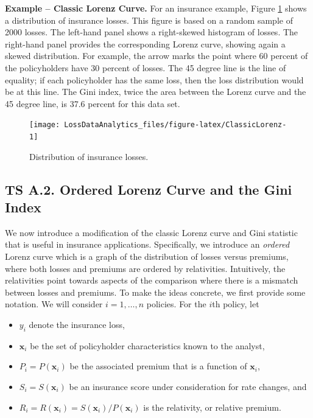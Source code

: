 \documentclass[]{book}
\providecommand{\tightlist}{%
  \setlength{\itemsep}{0pt}\setlength{\parskip}{0pt}}
\theoremstyle{definition}
\theoremstyle{definition}
\theoremstyle{definition}
\theoremstyle{remark}
\begin{document}
\textbf{Example -- Classic Lorenz Curve.} For an insurance example,
Figure \ref{fig:ClassicLorenz} shows a distribution of insurance losses.
This figure is based on a random sample of 2000 losses. The left-hand
panel shows a right-skewed histogram of losses. The right-hand panel
provides the corresponding Lorenz curve, showing again a skewed
distribution. For example, the arrow marks the point where 60 percent of
the policyholders have 30 percent of losses. The 45 degree line is the
line of equality; if each policyholder has the same loss, then the loss
distribution would be at this line. The Gini index, twice the area
between the Lorenz curve and the 45 degree line, is 37.6 percent for
this data set.

\begin{figure}

{\centering \texttt{[image: LossDataAnalytics\_files/figure-latex/ClassicLorenz-1]} 

}

\caption{Distribution of insurance losses.}\label{fig:ClassicLorenz}
\end{figure}

\subsection*{TS A.2. Ordered Lorenz Curve and the Gini
Index}\label{ts-a.2.-ordered-lorenz-curve-and-the-gini-index}

We now introduce a modification of the classic Lorenz curve and Gini
statistic that is useful in insurance applications. Specifically, we
introduce an \emph{ordered} Lorenz curve which is a graph of the
distribution of losses versus premiums, where both losses and premiums
are ordered by relativities. Intuitively, the relativities point towards
aspects of the comparison where there is a mismatch between losses and
premiums. To make the ideas concrete, we first provide some notation. We
will consider \(i=1, \ldots, n\) policies. For the \(i\)th policy, let

\begin{itemize}
\tightlist
\item
  \(y_i\) denote the insurance loss,
\item
  \(\mathbf{x}_i\) be the set of policyholder characteristics known to
  the analyst,
\item
  \(P_i=P(\mathbf{x}_i)\) be the associated premium that is a function
  of \(\mathbf{x}_i\),
\item
  \(S_i = S(\mathbf{x}_i)\) be an insurance score under consideration
  for rate changes, and
\item
  \(R_i = R(\mathbf{x}_i)=S(\mathbf{x}_i)/P(\mathbf{x}_i)\) is the
  relativity, or relative premium.
\end{itemize}
\end{document}

